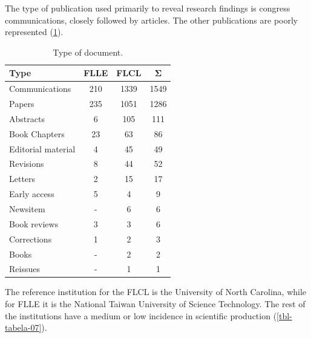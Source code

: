 \documentclass{textolivre}
\begin{document}
The type of publication used primarily to reveal research findings is congress communications, closely followed by articles. The other publications are poorly represented (\cref{tbl-tabela-06}).

\begin{table}[htpb]
\caption{Type of document.}
\label{tbl-tabela-06}
\centering
\begin{tabular}{lccc}
\toprule
\textbf{Type} & \textbf{FLLE} & \textbf{FLCL} & \textbf{Σ} \\ 
\midrule
Communications     & 210 & 1339 & 1549 \\ 
Papers             & 235 & 1051 & 1286 \\ 
Abstracts          & 6   & 105  & 111  \\ 
Book Chapters      & 23  & 63   & 86   \\ 
Editorial material & 4   & 45   & 49   \\ 
Revisions          & 8   & 44   & 52   \\ 
Letters            & 2   & 15   & 17   \\ 
Early access       & 5   & 4    & 9    \\ 
Newsitem           & -   & 6    & 6    \\ 
Book reviews       & 3   & 3    & 6    \\ 
Corrections        & 1   & 2    & 3    \\ 
Books              & -   & 2    & 2    \\ 
Reissues           & -   & 1    & 1    \\ 
\bottomrule
\end{tabular}
\end{table}

The reference institution for the FLCL is the University of North Carolina, while for FLLE it is the National Taiwan University of Science Technology. The rest of the institutions have a medium or low incidence in scientific production (\cref{tbl-tabela-07}).
\end{document}
